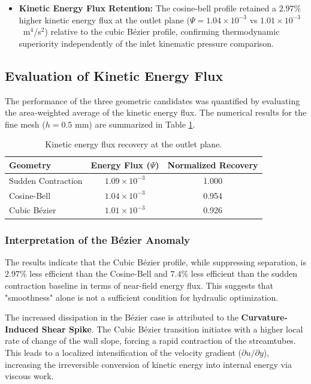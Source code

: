 \documentclass[12pt, a4paper]{article}
\begin{document}
\begin{itemize}
	\item \textbf{Kinetic Energy Flux Retention:} The cosine-bell profile 
	retained a $2.97\%$ higher kinetic energy flux at the outlet plane 
	($\Psi = 1.04\times10^{-3}$ vs $1.01\times10^{-3}$~m$^4$/s$^2$) relative 
	to the cubic B\'{e}zier profile, confirming thermodynamic superiority 
	independently of the inlet kinematic pressure comparison.
\end{itemize}

\subsection{Evaluation of Kinetic Energy Flux}

The performance of the three geometric candidates was quantified by evaluating the area-weighted average of the kinetic energy flux. The numerical results for the fine mesh ($h = 0.5$ mm) are summarized in Table \ref{tab:flux_results}.

\begin{table}[h]
	\centering
	\caption{Kinetic energy flux recovery at the outlet plane.}
	\label{tab:flux_results}
	\begin{tabular}{lcc}
		\toprule
		\textbf{Geometry} & \textbf{Energy Flux ($\Psi$)} & \textbf{Normalized Recovery} \\ \midrule
		Sudden Contraction & $1.09 \times 10^{-3}$ & 1.000 \\
		Cosine-Bell        & $1.04 \times 10^{-3}$ & 0.954 \\
		Cubic B\'{e}zier   & $1.01 \times 10^{-3}$ & 0.926 \\ \bottomrule
	\end{tabular}
\end{table}

\subsubsection{Interpretation of the B\'{e}zier Anomaly}
The results indicate that the Cubic B\'{e}zier profile, while suppressing separation, is $2.97\%$ less efficient than the Cosine-Bell and $7.4\%$ less efficient than the sudden contraction baseline in terms of near-field energy flux. This suggests that "smoothness" alone is not a sufficient condition for hydraulic optimization. 

The increased dissipation in the B\'{e}zier case is attributed to the \textbf{Curvature-Induced Shear Spike}. The Cubic B\'{e}zier transition initiates with a higher local rate of change of the wall slope, forcing a rapid contraction of the streamtubes. This leads to a localized intensification of the velocity gradient ($\partial u / \partial y$), increasing the irreversible conversion of kinetic energy into internal energy via viscous work.
\end{document}
